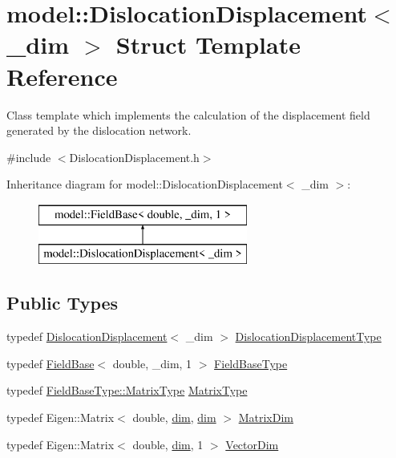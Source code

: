 \hypertarget{structmodel_1_1_dislocation_displacement}{}\section{model\+:\+:Dislocation\+Displacement$<$ \+\_\+dim $>$ Struct Template Reference}
\label{structmodel_1_1_dislocation_displacement}


Class template which implements the calculation of the displacement field generated by the dislocation network.  




{\ttfamily \#include $<$Dislocation\+Displacement.\+h$>$}

Inheritance diagram for model\+:\+:Dislocation\+Displacement$<$ \+\_\+dim $>$\+:\begin{figure}[H]
\begin{center}
\leavevmode
\includegraphics[height=2.000000cm]{structmodel_1_1_dislocation_displacement}
\end{center}
\end{figure}
\subsection*{Public Types}
\begin{DoxyCompactItemize}
\item 
typedef \hyperlink{structmodel_1_1_dislocation_displacement}{Dislocation\+Displacement}$<$ \+\_\+dim $>$ \hyperlink{structmodel_1_1_dislocation_displacement_adde055a38d123dbc238c2d91147116a3}{Dislocation\+Displacement\+Type}
\item 
typedef \hyperlink{structmodel_1_1_field_base}{Field\+Base}$<$ double, \+\_\+dim, 1 $>$ \hyperlink{structmodel_1_1_dislocation_displacement_a2c9547dc21cd314912e3e0bfd9c1306d}{Field\+Base\+Type}
\item 
typedef \hyperlink{structmodel_1_1_field_base_a2a46afe1dafac6e3d1c95d32fc9a58a3}{Field\+Base\+Type\+::\+Matrix\+Type} \hyperlink{structmodel_1_1_dislocation_displacement_a4eaccfbc1b90e521f051be8759244719}{Matrix\+Type}
\item 
typedef Eigen\+::\+Matrix$<$ double, \hyperlink{structmodel_1_1_dislocation_displacement_acf0c18c91d020e290940fea31cce1e3a}{dim}, \hyperlink{structmodel_1_1_dislocation_displacement_acf0c18c91d020e290940fea31cce1e3a}{dim} $>$ \hyperlink{structmodel_1_1_dislocation_displacement_ae30a5dcabf2aa63c6d10ce23ad8eaaa3}{Matrix\+Dim}
\item 
typedef Eigen\+::\+Matrix$<$ double, \hyperlink{structmodel_1_1_dislocation_displacement_acf0c18c91d020e290940fea31cce1e3a}{dim}, 1 $>$ \hyperlink{structmodel_1_1_dislocation_displacement_a728295e03ab8d564237fec50c71f8b50}{Vector\+Dim}
\end{DoxyCompactItemize}
